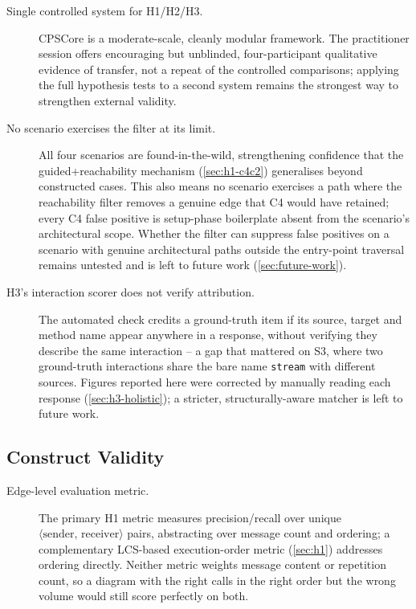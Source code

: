 \begin{description}
  \item[Single controlled system for H1/H2/H3.] CPSCore is a
    moderate-scale, cleanly modular framework. The practitioner session
    offers encouraging but unblinded, four-participant qualitative
    evidence of transfer, not a repeat of the controlled comparisons;
    applying the full hypothesis tests to a second system remains the
    strongest way to strengthen external validity.

  \item[No scenario exercises the filter at its limit.] All
    four scenarios are found-in-the-wild,
    strengthening confidence that the guided+reachability
    mechanism (\cref{sec:h1-c4c2}) generalises beyond constructed cases.
    This also means no scenario exercises a path where the reachability
    filter removes a genuine edge that C4 would have retained; every
    C4 false positive is setup-phase boilerplate absent from the
    scenario's architectural scope. Whether the filter can suppress
    false positives on a scenario with genuine architectural paths
    outside the entry-point traversal remains untested and is
    left to future work (\cref{sec:future-work}).

  \item[H3's interaction scorer does not verify attribution.] The
    automated check credits a ground-truth item if its source, target
    and method name appear anywhere in a response, without verifying
    they describe the same interaction -- a gap that mattered on S3,
    where two ground-truth interactions share the bare name
    \texttt{stream} with different sources. Figures reported here were
    corrected by manually reading each response
    (\cref{sec:h3-holistic}); a stricter, structurally-aware matcher is
    left to future work.
\end{description}

\subsection{Construct Validity}

\begin{description}
  \item[Edge-level evaluation metric.] The primary H1 metric measures
    precision/recall over unique $\langle\text{sender},\,
    \text{receiver}\rangle$ pairs, abstracting over message count and
    ordering; a complementary LCS-based execution-order metric
    (\cref{sec:h1}) addresses ordering directly. Neither metric weights
    message content or repetition count, so a diagram with the right
    calls in the right order but the wrong volume would still score
    perfectly on both.
\end{description}
